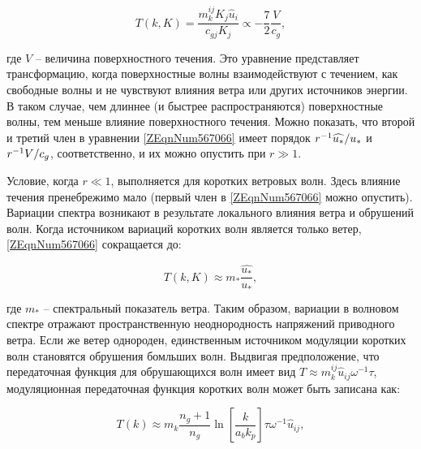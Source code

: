 \begin{equation} \label{1.40)} T\left(k,K\right)=\frac{m_{k}^{ij} K_{j} \widehat{u}_{i} }{c_{gj} K_{j} } \propto -\frac{7}{2} \frac{V}{c_{g} } ,  \end{equation} 



где $V$ -- величина поверхностного течения. Это уравнение представляет трансформацию, когда поверхностные волны взаимодействуют с течением, как свободные волны и не чувствуют влияния ветра или других источников энергии. В таком случае, чем длиннее (и быстрее распространяются) поверхностные волны, тем меньше влияние поверхностного течения. Можно показать, что второй и третий член в уравнении \eqref{ZEqnNum567066} имеет порядок $r^{-1} {\widehat{u_{*} }\mathord{\left/ {\vphantom {\widehat{u_{*} } u_{*} }} \right. \kern-\nulldelimiterspace} u_{*} } $ и $r^{-1} {V\mathord{\left/ {\vphantom {V c_{g} }} \right. \kern-\nulldelimiterspace} c_{g} } $, соответственно, и их можно опустить при $r\gg 1$.

Условие, когда $r\ll 1$, выполняется для коротких ветровых волн. Здесь влияние течения пренебрежимо мало (первый член в \eqref{ZEqnNum567066} можно опустить). Вариации спектра возникают в результате локального влияния ветра и обрушений волн. Когда источником вариаций коротких волн является только ветер, \eqref{ZEqnNum567066} сокращается до:

\begin{equation} \label{1.41)} T\left(k,K\right)\approx m_{*} \frac{\widehat{u_{*} }}{u_{*} } ,  \end{equation} 



где $m_{*} $ -- спектральный показатель ветра. Таким образом, вариации в волновом спектре отражают пространственную неоднородность напряжений приводного ветра. Если же ветер однороден, единственным источником модуляции коротких волн становятся обрушения бомльших волн. Выдвигая предположение, что передаточная функция для обрушающихся волн имеет вид $T\approx m_{k}^{ij} \widehat{u}_{ij} \omega ^{-1} \tau $, модуляционная передаточная функция коротких волн может быть записана как:



\begin{equation} \label{1.42)} T\left(k\right)\approx m_{k} \frac{n_{g} +1}{n_{g} } \ln \left[\frac{k}{a_{b} k_{p} } \right]\tau \omega ^{-1} \widehat{u}_{ij} ,  \end{equation} 



